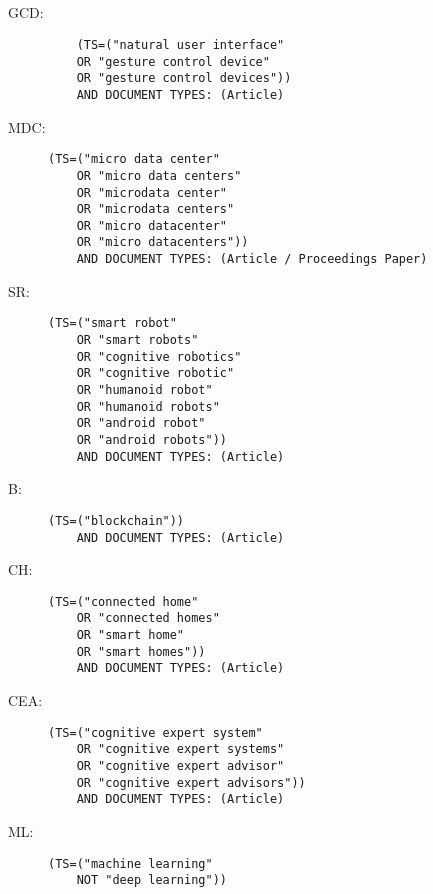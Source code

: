 \renewcommand{\appendixname}{Anhang}
\renewcommand{\appendixtocname}{Anhang}
\renewcommand{\appendixpagename}{Anhang}

\begin{appendices}
	\section{}\label{sec:sci_raw_dist}
\end{appendices}


\begin{description}
	\item[GCD:]	\begin{verbatim}
	(TS=("natural user interface"
	OR "gesture control device"
	OR "gesture control devices"))
	AND DOCUMENT TYPES: (Article)
	\end{verbatim}
	\item[MDC:] \begin{verbatim}(TS=("micro data center"
	OR "micro data centers"
	OR "microdata center"
	OR "microdata centers"
	OR "micro datacenter"
	OR "micro datacenters"))
	AND DOCUMENT TYPES: (Article / Proceedings Paper)\end{verbatim}
	\item[SR:] \begin{verbatim}(TS=("smart robot"
	OR "smart robots"
	OR "cognitive robotics"
	OR "cognitive robotic"
	OR "humanoid robot"
	OR "humanoid robots"
	OR "android robot"
	OR "android robots"))
	AND DOCUMENT TYPES: (Article) \end{verbatim}
	\item[B:] \begin{verbatim}(TS=("blockchain"))
	AND DOCUMENT TYPES: (Article)\end{verbatim}
	\item[CH:] \begin{verbatim}(TS=("connected home"
	OR "connected homes"
	OR "smart home"
	OR "smart homes"))
	AND DOCUMENT TYPES: (Article)\end{verbatim}
	\item[CEA:] \begin{verbatim}(TS=("cognitive expert system"
	OR "cognitive expert systems"
	OR "cognitive expert advisor"
	OR "cognitive expert advisors"))
	AND DOCUMENT TYPES: (Article)\end{verbatim}
	\item[ML:] \begin{verbatim}(TS=("machine learning"
	NOT "deep learning"))

\end{verbatim}
\end{description}
